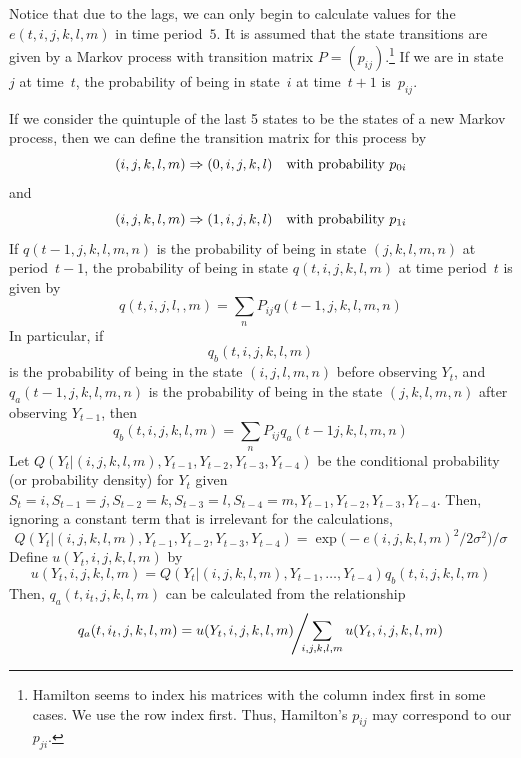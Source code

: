 \documentclass{admbmanual}
\begin{document}
Notice that due to the lags, we can only begin to calculate values for the
$e(t,i,j,k,l,m)$ in time period~$5$. It is assumed that the state transitions
are given by a Markov process with transition matrix
$P=(p_{ij})$.\footnote{Hamilton seems to index his matrices with the column
  index first in some cases. We use the row index first. Thus, Hamilton's
  $p_{ij}$ may correspond to our $p_{ji}$.} If we are in state~$j$ at time~$t$,
the probability of being in state~$i$ at time~$t+1$ is~$p_{ij}$.

If we consider the quintuple of the last 5 states to be the states of a new
Markov process, then we can define the transition matrix for this process by
$$(i,j,k,l,m) \Rightarrow (0,i,j,k,l)
 \hbox{\rm \quad with probability\ } p_{0i}$$
and
$$(i,j,k,l,m) \Rightarrow (1,i,j,k,l)
\hbox{\rm \quad with probability\ } p_{1i}$$ If $q(t-1,j,k,l,m,n)$ is the
probability of being in state $(j,k,l,m,n)$ at period~$t-1$, the probability of
being in state $q(t,i,j,k,l,m)$ at time period~$t$ is given by
$$q(t,i,j,l,,m)=\sum_{n}
P_{ij}q(t-1,j,k,l,m,n)$$ In particular, if $$q_b(t,i,j,k,l,m)$$ is the
probability of being in the state $(i,j,l,m,n)$ before observing $Y_t$, and
\hbox{$q_a(t-1,j,k,l,m,n)$} is the probability of being in the state
$(j,k,l,m,n)$ after observing $Y_{t-1}$, then
\begin{equation}
 {
q_b(t,i,j,k,l,m)=\sum_{n}
  P_{ij}q_a(t-1j,k,l,m,n)}
\label{chp4:xx3}
\end{equation}
Let $Q(Y_t|(i,j,k,l,m),Y_{t-1},Y_{t-2},Y_{t-3},Y_{t-4})$ be the conditional
probability (or probability density) for $Y_t$ given
$S_{t}=i,S_{t-1}=j,S_{t-2}=k,S_{t-3}=l,S_{t-4}=m,
Y_{t-1},Y_{t-2},Y_{t-3},Y_{t-4}$. Then, ignoring a constant term that is
irrelevant for the calculations,
\begin{equation}
{
Q(Y_t|(i,j,k,l,m),Y_{t-1},Y_{t-2},Y_{t-3},Y_{t-4})=
  \exp\big({}-e(i,j,k,l,m)^2/2\sigma^2\big)/\sigma }
\label{chp4:xx4}
\end{equation}
Define $u(Y_t,i,j,k,l,m)$ by
\begin{equation}
 u(Y_t,i,j,k,l,m)=
{
  Q(Y_t|(i,j,k,l,m),Y_{t-1},\ldots,Y_{t-4})
    q_b(t,i,j,k,l,m)}
\label{chp4:xx5}
\end{equation}
Then, $q_a(t,i_{t},j,k,l,m)$ can be calculated from the relationship
\begin{equation}
{
  q_a(t,i_{t},j,k,l,m)= u(Y_t,i,j,k,l,m)\kern-.2em \raisebox{-.2em}
  {\Bigg/}\kern-.7em \sum_{i,j,k,l,m} u(Y_t,i,j,k,l,m)}
\label{chp4:xx6}
\end{equation}
\end{document}
